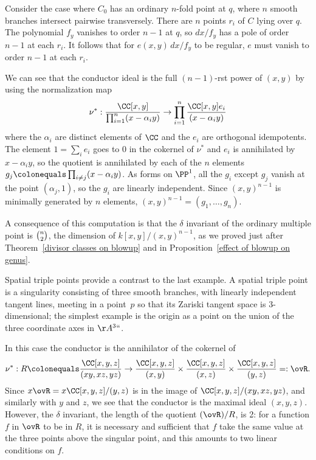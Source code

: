 \begin{example}
\label{ord n-fold}
Consider the case where $C_{0}$ has an ordinary $n$-fold point at  $q$,
where
$n$
smooth branches intersect pairwise transversely.
There are
$n$ points
%
$r_i$ of $C$ lying over $q$. The polynomial $f_y$ vanishes to order $n-1$
at $q$, so $dx/f_y$ has a pole of order $n-1$ at
each $r_i$. It follows that for $e(x,y)\,dx/f_y$ to be regular, $e$ must
vanish to order $n-1$ at each $r_i$.

We can see that the conductor ideal is the full $(n-1)$-rst power of
$(x,y)$ by using the
normalization map
$$
\nu^{*}: \frac{\CC[x,y]}{\prod_{i=1}^{n} (x-\alpha_{i}y)} \to
 \prod_{i=1}^{n} \frac{\CC[x,y]e_{i}}{(x-\alpha_{i}y)}
$$
where the $\alpha_{i}$ are distinct elements of $\CC$ and the $e_{i}$
are orthogonal idempotents.
The element $1 = \sum_{i}e_{i}$ goes to 0 in the cokernel of $\nu^{*}$
and $e_{i}$
is annihilated by $x-\alpha_{i}y$,
so the quotient is annihilated by each of the $n$ elements $g_{j}
\colonequals  \prod_{i\neq j} (x-\alpha_{i}y)$.
As forms on $\PP^{1}$, all the $g_{i}$ except $g_{j}$ vanish at the
point $(\alpha_{j}, 1)$, so the $g_{i}$ are linearly independent. Since
$(x,y)^{n-1}$ is minimally generated by $n$ elements, $(x,y)^{n-1} =
(g_{1}, \dots, g_{n})$.

A consequence of this computation is that the $\delta$ invariant of the
%
ordinary multiple point is $\tbinom{n}{2}$, the dimension of
%
$k[x,y]/(x,y)^{n-1}$, as we proved just after
Theorem~\ref{divisor classes on blowup} and in
Proposition~\ref{effect of blowup on genus}.
\end{example}

\begin{example}\label{spatial triple points}
Spatial triple points provide a contrast to the last example. A
spatial triple point is a singularity consisting of three smooth
branches, with linearly independent tangent lines, meeting
in a point~$p$ so that its Zariski tangent space is 3-dimensional; the simplest
%
example is the origin as a point on the union of the three coordinate
axes in $\AA^3` `$.

In this case the conductor is the annihilator of the cokernel of
\vspace{3pt}
$$
\nu^{*}: R \colonequals  \frac{\CC[x,y,z]}{(xy, xz, yz)} \to
\frac{\CC[x,y,z]}{(x,y)} \times \frac{\CC[x,y,z]}{(x,z)} \times
\frac{\CC[x,y,z]}{(y,z)} =: \ovR.
$$
Since $x\ovR = x \CC[x,y,z]/(y,z)$ is in the image of
$\CC[x,y,z]/(xy, xz, yz)$, and similarly with $y$ and $z$,
we see that the conductor is the maximal ideal $(x,y,z)$. However,
the $\delta$ invariant, the length
%
of the quotient $(\ovR)/R$, is 2: for a function $f$ in $\ovR$ to be in $R$, it
is necessary and sufficient that $f$ take the same value at the three
points above the singular point,
and this
amounts to two
linear conditions on $f$.
\end{example}

